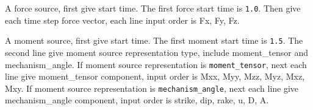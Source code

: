 A force source, first give start time. The first force start time is \texttt{1.0}. Then give each time step force vector, each line input order is Fx, Fy, Fz.

A moment source, first give start time. The first moment start time is \texttt{1.5}. The second line give moment source representation type, include moment\_tensor and mechanism\_angle. If moment source representation is \texttt{moment\_tensor}, next each line give moment\_tensor component, input order is Mxx, Myy, Mzz, Myz, Mxz, Mxy. If moment source representation is \texttt{mechanism\_angle}, next each line give mechanism\_angle component, input order is strike, dip, rake, u, D, A. 

